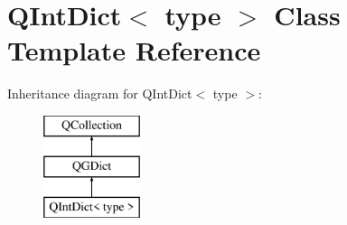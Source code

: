 \hypertarget{class_q_int_dict}{}\section{Q\+Int\+Dict$<$ type $>$ Class Template Reference}
\label{class_q_int_dict}
Inheritance diagram for Q\+Int\+Dict$<$ type $>$\+:\begin{figure}[H]
\begin{center}
\leavevmode
\includegraphics[height=3.000000cm]{class_q_int_dict}
\end{center}
\end{figure}
